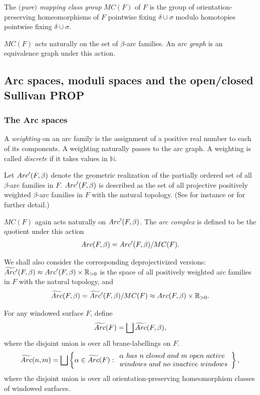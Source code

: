 \documentclass[11pt]{article}
\begin{document}
The {\it $($pure$)$ mapping class group} $MC(F)$ of $F$ is the group of
orientation-preserving homeomorphisms of $F$ pointwise f\/ixing
$\delta\cup\sigma$ modulo homotopies pointwise f\/ixing $\delta\cup\sigma$.


$MC(F)$ acts naturally on the set of $\beta$-arc families.
An {\it arc graph} is an equivalence graph under this action.

\subsection{Arc spaces, moduli spaces and the open/closed Sullivan PROP}
\subsubsection{The Arc spaces}



A {\it  weighting} on an arc family is the assignment of
a positive  real number to each of its components.
A weighting naturally passes to the arc graph.
A weighting is called {\it discrete} if it takes values in ${\mathbb N}$.



Let ${\rm Arc}'(F,\beta )$ denote the geometric realization of the partially
ordered set of all $\beta$-arc families in $F$.  ${\rm Arc}'(F,\beta )$ is
described as the set of all projective positively weighted $\beta$-arc
families in $F$ with the natural topology. (See for instance \cite{KLP} or \cite{P1} for
further detail.)

$MC(F)$ again
acts naturally on ${\rm Arc}'(F,\beta )$.  The {\it arc
complex} is def\/ined to be the  quotient under this action
\[
{\rm Arc}(F,\beta )={\rm Arc}'(F,\beta )/MC(F).
\]

We shall also consider the corresponding deprojectivized versions:
$\widetilde{\rm Arc}{}'(F,\beta )\approx {\rm Arc}'(F,\beta )\times{\mathbb R}_{>0}$ is the space of all positively weighted arc
families in $F$ with the natural topology, and
\[
\widetilde{\rm Arc}(F,\beta )=\widetilde{\rm Arc}{}'(F,\beta )/MC(F)\approx
{\rm Arc}(F,\beta )\times{\mathbb R}_{>0}.
\]



For any windowed surface $F$, def\/ine
\[
\widetilde{\rm Arc}(F)=\bigsqcup \widetilde{\rm Arc}(F,\beta),
\]
where the disjoint union is over all brane-labellings on $F$.
\[
\widetilde{\rm Arc}(n,m)=\bigsqcup \left\{ \alpha\in \widetilde{\rm Arc}(F):
\begin{array}{l}\alpha ~{\rm has}~n~{\rm closed~and}~ m~{\rm
open~active}\\{\rm
windows~and~no~inactive~windows}\end{array}\right\},
\] where the
disjoint union is over all orientation-preserving
homeomorphism classes of windowed surfaces.
\end{document}
